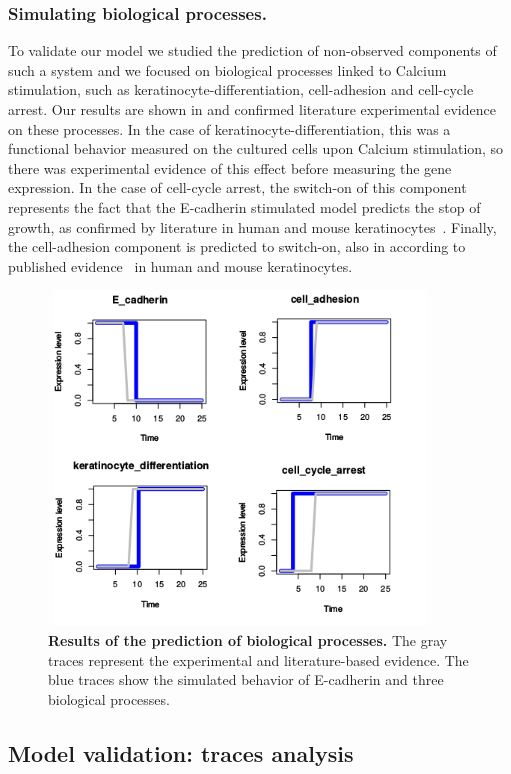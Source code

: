 \subsubsection{Simulating biological processes.}
To validate our model we studied the prediction of non-observed components of such a system and we focused on biological processes linked 
to Calcium stimulation, such as keratinocyte-differentiation, cell-adhesion and cell-cycle arrest.
Our results are shown in  and confirmed literature experimental evidence on these processes.
In the case of keratinocyte-differentiation, this was a functional behavior measured on the cultured cells upon Calcium stimulation,
 so there was experimental evidence of this effect before measuring the gene expression.  
In the case of cell-cycle arrest, the switch-on of this component represents the fact that the E-cadherin stimulated model predicts the stop 
of growth, as confirmed by literature in human and mouse keratinocytes~\cite{Kolly2005}.
Finally, the cell-adhesion component is predicted to switch-on, also in according to published evidence~\cite{Tu2011} in human and mouse keratinocytes.

\begin{figure}[H]
\centering
\includegraphics[width=4in,height=3.5in]{images/key_nodes1.png}
\caption{{\bf Results of the prediction of biological processes.} The gray traces represent the experimental and literature-based evidence.
The blue traces show the simulated behavior of E-cadherin and three biological processes.}
\label{fig:knodes}
\end{figure}

\subsection{Model validation: traces analysis}


